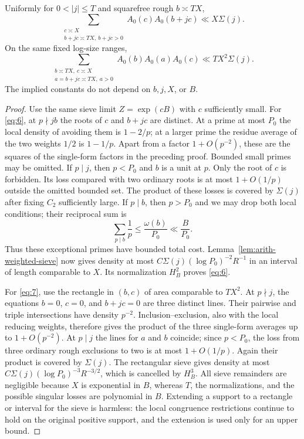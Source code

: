 \begin{lemma}
\label{lem:arith-form-bounds}
Uniformly for $0<|j|\le T$ and squarefree rough $b\asymp TX$,
\begin{equation}
 \sum_{\substack{c\asymp X\\b+jc\asymp TX,\ b+jc>0}}
               A_0(c)A_0(b+jc)\ll X\Sigma(j).
 \label{eq:6}
\end{equation}
On the same fixed log-size ranges,
\begin{equation}
 \sum_{\substack{b\asymp TX,\ c\asymp X\\a=b+jc\asymp TX,\ a>0}}
               A_0(b)A_0(a)A_0(c)\ll TX^2\Sigma(j).
 \label{eq:7}
\end{equation}
The implied constants do not depend on $b,j,X$, or $B$.
\end{lemma}

\begin{proof}
Use the same sieve limit $Z=\exp(cB)$ with $c$ sufficiently small.
For \eqref{eq:6}, at $p\nmid jb$ the roots of $c$ and $b+jc$ are distinct.
At a prime at most $P_0$ the local density of avoiding them is $1-2/p$;
at a larger prime the residue average of the two weights $1/2$ is $1-1/p$.
Apart from a factor $1+O(p^{-2})$, these are the squares of the single-form
factors in the preceding proof.  Bounded small primes may be omitted.
If $p\mid j$, then $p<P_0$ and $b$ is a unit at $p$.  Only the root of $c$
is forbidden.  Its loss compared with two ordinary roots is at most
$1+O(1/p)$ outside the omitted bounded set.  The product of these losses
is covered by $\Sigma(j)$ after fixing $C_2$ sufficiently large.
If $p\mid b$, then $p>P_0$ and we may drop both local conditions; their
reciprocal sum is
\[
 \sum_{p\mid b}\frac1p\le\frac{\omega(b)}{P_0}
                   \ll\frac{B}{P_0}.
\]
Thus these exceptional primes have bounded total cost.
Lemma~\ref{lem:arith-weighted-sieve} now gives density at most
$C\Sigma(j)(\log P_0)^{-2}R^{-1}$ in an interval of length comparable to
$X$.  Its normalization $H_B^2$ proves \eqref{eq:6}.

For \eqref{eq:7}, use the rectangle in $(b,c)$ of area comparable to
$TX^2$.  At $p\nmid j$, the equations
$b=0$, $c=0$, and $b+jc=0$ are three distinct lines.
Their pairwise and triple intersections have density $p^{-2}$.
Inclusion--exclusion, also with the local reducing weights, therefore
gives the product of the three single-form averages up to
$1+O(p^{-2})$.  At $p\mid j$ the lines for $a$ and $b$ coincide; since
$p<P_0$, the loss from three ordinary rough exclusions to two is at most
$1+O(1/p)$.  Again their product is covered by $\Sigma(j)$.
The rectangular sieve gives density at most
$C\Sigma(j)(\log P_0)^{-3}R^{-3/2}$, which is cancelled by $H_B^3$.
All sieve remainders are negligible because $X$ is exponential in $B$,
whereas $T$, the normalizations, and the possible singular losses are
polynomial in $B$.  Extending a support to a rectangle or interval for the
sieve is harmless: the local congruence restrictions continue to hold on
the original positive support, and the extension is used only for an upper
bound.
\end{proof}

